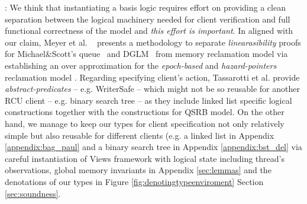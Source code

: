 : We think that instantiating a basis logic requires effort on providing a clean separation between the logical machinery needed for client verification and full functional correctness of the model and \textit{this effort is important}. In aligned with our claim, Meyer et al. ~\cite{} presents a methodology to separate \textit{linearasibility} proofs for Michael\&Scott's queue~\cite{Michael:1996:SFP:248052.248106} and DGLM~\cite{Doherty:2004:DSB:1007912.1007945} from memory reclamation model via establishing an over approximation for the \textit{epoch-based} and \textit{hazard-pointers} reclamation model . Regarding specifying client's action, Tassarotti et al. provide \textit{abstract-predicates} -- e.g. WriterSafe -- which might not be so reusable for another RCU client -- e.g. binary search tree -- as they include linked list specific logical constructions together with the constructions for QSRB model. On the other hand, we manage to keep our types for client specification not only relatively simple but also reusable for different clients (e.g. a linked list in Appendix \ref{appendix:bag_paul} and a binary search tree in Appendix \ref{appendix:bst_del} via careful instantiation of Views framework with logical state including thread's observations, global memory invariants in Appendix \ref{sec:lemmas} and the denotations of our types in Figure \ref{fig:denotingtypeenviroment} Section \ref{sec:soundness}. 
